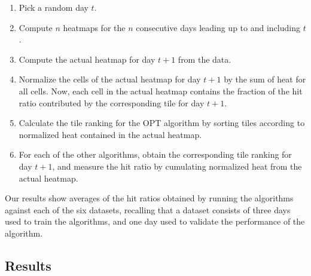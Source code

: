 \documentclass[11pt, oneside]{report}
\begin{document}
{\begin{enumerate}
\item Pick a random day $t$.
\item Compute $n$ heatmaps for the $n$ consecutive days leading up to and including $t$.
\item Compute the actual heatmap for day $t+1$ from the data. 
\item Normalize the cells of the actual heatmap for day $t+1$ by the sum of heat for all cells. Now, each cell in the actual heatmap contains the fraction of the hit ratio contributed by the corresponding tile for day $t+1$. 
\item Calculate the tile ranking for the OPT algorithm by sorting tiles according to normalized heat contained in the actual heatmap.
\item For each of the other algorithms, obtain the corresponding tile ranking for day $t+1$, and measure the hit ratio by cumulating normalized heat from the actual heatmap.    
\end{enumerate}


Our results show averages of the hit ratios obtained by running the algorithms against each of the six datasets, recalling that a dataset consists of three days used to train the algorithms, and one day used to validate the performance of the algorithm.

\subsection{Results}
\label{sec:results}

}
\end{document}
